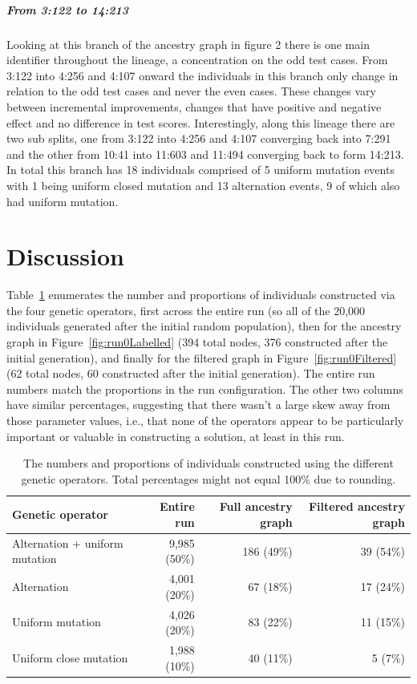 \subparagraph{From 3:122 to 14:213}
Looking at this branch of the ancestry graph in figure 2 there is one main identifier
throughout the lineage, a concentration on the odd test cases. From 3:122 into 4:256 and 4:107
onward the individuals in this branch only change in relation to the odd test cases and never
the even cases. These changes vary between incremental improvements, changes that have positive
and negative effect and no difference in test scores. Interestingly, along this lineage there are
two sub splits, one from 3:122 into 4:256 and 4:107 converging back into 7:291 and the other from
10:41 into 11:603 and 11:494 converging back to form 14:213. In total this branch has 18 
individuals comprised of 5 uniform mutation events with 1 being uniform closed mutation and 
13 alternation events, 9 of which also had uniform mutation.

\section{Discussion}
\label{sec:discussion}


Table~\ref{tab:operatorCounts} enumerates the number and proportions 
of individuals constructed via the four genetic operators, first across the
entire run (so all of the 20,000 individuals generated after the initial
random population), then for the ancestry graph in 
Figure~\ref{fig:run0Labelled} (394 total nodes, 
376 constructed after the initial generation), and finally for the filtered
graph in Figure~\ref{fig:run0Filtered} (62 total nodes, 60 constructed after 
the initial generation). The entire run numbers match the proportions
in the run configuration. The other two columns have similar percentages,
suggesting that there wasn't a large skew away from those parameter values,
i.e., that none of the operators appear to be particularly important or
valuable in constructing a solution, at least in this run.

\begin{table}[t]
	\begin{tabular}{lrrr}
		\textbf{Genetic operator} & \textbf{Entire run} & \; \textbf{Full ancestry graph} & \; \textbf{Filtered ancestry graph} \\ 
		\hline
		Alternation + uniform mutation & 9,985 (50\%) & 186 (49\%) & 39 (54\%) \\ 
		Alternation & 4,001 (20\%) & 67 (18\%) & 17 (24\%) \\ 
		Uniform mutation & 4,026 (20\%) & 83 (22\%) & 11 (15\%) \\ 
		Uniform close mutation & 1,988 (10\%) & 40 (11\%) & 5 (7\%)
	\end{tabular} 
	\caption{The numbers and proportions of individuals constructed using
		the different genetic operators. Total percentages might not equal 100\% due to rounding.}
	\label{tab:operatorCounts}
\end{table}

